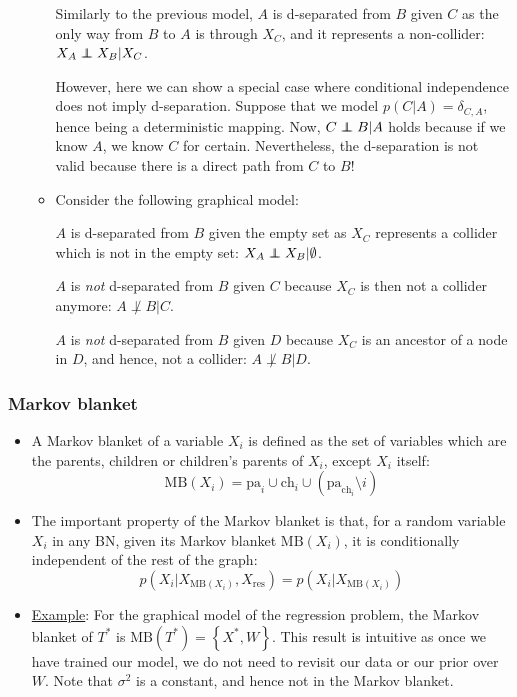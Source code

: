 \begin{itemize}
\begin{itemize}
		Similarly to the previous model, $A$ is d-separated from $B$ given $C$ as the only way from $B$ to $A$ is through $X_C$, and it represents a non-collider: $X_A\independent X_B|X_C$.
		
		However, here we can show a special case where conditional independence does not imply d-separation. Suppose that we model $p(C|A)=\delta_{C,A}$, hence being a deterministic mapping. Now, $C\independent B|A$ holds because if we know $A$, we know $C$ for certain. Nevertheless, the d-separation is not valid because there is a direct path from $C$ to $B$! 
		
		\item Consider the following graphical model:
		\begin{figure}[ht!]
			\centering
		\end{figure}
	
		$A$ is d-separated from $B$ given the empty set as $X_C$ represents a collider which is not in the empty set: $X_A\independent X_B|\emptyset$.
		
		$A$ is \textit{not} d-separated from $B$ given $C$ because $X_C$ is then not a collider anymore: $A\not\perp B|C$.
		
		$A$ is \textit{not} d-separated from $B$ given $D$ because $X_C$ is an ancestor of a node in $D$, and hence, not a collider: $A\not\perp B|D$.
	\end{itemize}
\end{itemize}
\subsubsection{Markov blanket}
\begin{itemize}
	\item A Markov blanket of a variable $X_i$ is defined as the set of variables which are the parents, children or children's parents of $X_i$, except $X_i$ itself:
	$$\text{MB}(X_i)=\text{pa}_i \cup \text{ch}_i \cup \left(\text{pa}_{\text{ch}_i}\setminus i\right)$$
	\item The important property of the Markov blanket is that, for a random variable $X_i$ in any BN, given its Markov blanket $\text{MB}(X_i)$, it is conditionally independent of the rest of the graph:
	$$p\left(X_i|X_{\text{MB}(X_i)}, X_{\text{res}}\right) = p\left(X_i|X_{\text{MB}(X_i)}\right)$$
	\item \underline{Example}: For the graphical model of the regression problem, the Markov blanket of $T^{*}$ is $\text{MB}(T^{*})=\left\{X^{*}, W\right\}$. This result is intuitive as once we have trained our model, we do not need to revisit our data or our prior over $W$. Note that $\sigma^2$ is a constant, and hence not in the Markov blanket.
\end{itemize}
